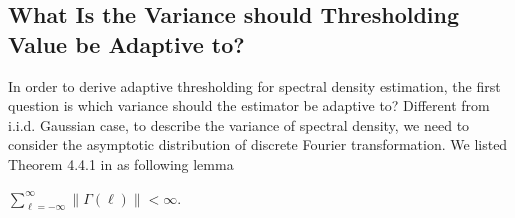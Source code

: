 \subsection{What Is the Variance should Thresholding Value be Adaptive to?}
In order to derive adaptive thresholding for spectral density estimation, the first question is 
which variance should the estimator be adaptive to? 
Different from i.i.d. Gaussian case, to describe the variance of spectral density, we need to consider the asymptotic distribution of discrete Fourier transformation. We listed Theorem 4.4.1 in  \cite{brillinger2001time} as following lemma 
\begin{assumption}\label{assumption:finite_auto}
$\sum_{\ell=-\infty}^\infty \|\Gamma(\ell)\|<\infty$. 
\end{assumption}

